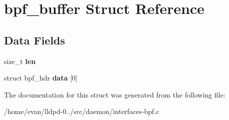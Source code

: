 \section{bpf\-\_\-buffer \-Struct \-Reference}
\label{structbpf__buffer}
\subsection*{\-Data \-Fields}
\begin{DoxyCompactItemize}
\item 
size\-\_\-t {\bfseries len}\label{structbpf__buffer_a7360b55975153b822efc5217b7734e6a}

\item 
struct bpf\-\_\-hdr {\bfseries data} [0]\label{structbpf__buffer_a7f4846466b134dcd6419db540664690c}

\end{DoxyCompactItemize}


\-The documentation for this struct was generated from the following file\-:\begin{DoxyCompactItemize}
\item 
/home/evan/lldpd-\/0../src/daemon/interfaces-\/bpf.\-c\end{DoxyCompactItemize}
